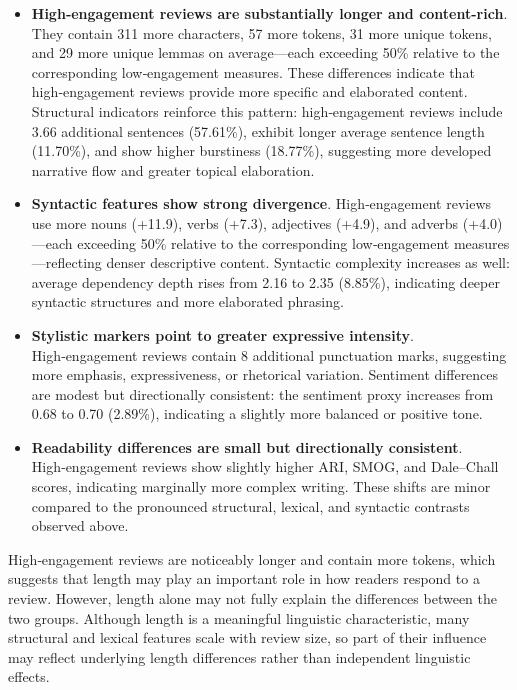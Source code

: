 \documentclass[
]{article}
\begin{document}
\begin{itemize}  

\item \textbf{High‑engagement reviews are substantially longer and content-rich}.  
They contain 311 more characters, 57 more tokens, 31 more unique tokens, and 29 more unique lemmas on average—each exceeding 50\% relative to the corresponding low‑engagement measures. These differences indicate that high‑engagement reviews provide more specific and elaborated content. Structural indicators reinforce this pattern: high‑engagement reviews include 3.66 additional sentences (57.61\%), exhibit longer average sentence length (11.70\%), and show higher burstiness (18.77\%), suggesting more developed narrative flow and greater topical elaboration.

\item \textbf{Syntactic features show strong divergence}.  
High‑engagement reviews use more nouns (+11.9), verbs (+7.3), adjectives (+4.9), and adverbs (+4.0)—each exceeding 50\% relative to the corresponding low‑engagement measures—reflecting denser descriptive content. Syntactic complexity increases as well: average dependency depth rises from 2.16 to 2.35 (8.85\%), indicating deeper syntactic structures and more elaborated phrasing.

\item \textbf{Stylistic markers point to greater expressive intensity}.  
High‑engagement reviews contain 8 additional punctuation marks, suggesting more emphasis, expressiveness, or rhetorical variation. Sentiment differences are modest but directionally consistent: the sentiment proxy increases from 0.68 to 0.70 (2.89\%), indicating a slightly more balanced or positive tone.

\item \textbf{Readability differences are small but directionally consistent}.  
High‑engagement reviews show slightly higher ARI, SMOG, and Dale–Chall scores, indicating marginally more complex writing. These shifts are minor compared to the pronounced structural, lexical, and syntactic contrasts observed above.

\end{itemize}

High‑engagement reviews are noticeably longer and contain more tokens,
which suggests that length may play an important role in how readers
respond to a review. However, length alone may not fully explain the
differences between the two groups. Although length is a meaningful
linguistic characteristic, many structural and lexical features scale
with review size, so part of their influence may reflect underlying
length differences rather than independent linguistic effects.
\end{document}
